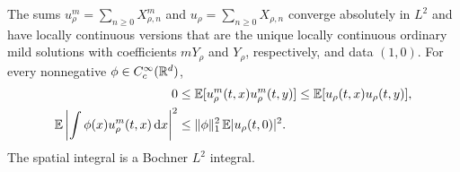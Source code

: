 \begin{proposition}
  \label{P:masked-source-moments}
  The sums $u_\rho^m = \sum_{n\ge0}X_{\rho,n}^m$ and $u_\rho =
  \sum_{n\ge0}X_{\rho,n}$ converge absolutely in $L^2$ and have locally
  continuous versions that are the unique locally continuous ordinary mild
  solutions with coefficients $mY_\rho$ and $Y_\rho$, respectively, and data
  $(1,0)$. For every nonnegative $\phi \in C_c^\infty(\mathbb{R}^d)$,
  \begin{align}
    0&\le\mathbb{E}[u_\rho^m(t,x)u_\rho^m(t,y)]
    \le\mathbb{E}[u_\rho(t,x)u_\rho(t,y)],\label{E:masked-two-point}\\
    \mathbb{E}\left|\int\phi(x)u_\rho^m(t,x)\,\mathrm{d} x\right|^2
    &\le \|\phi\|_1^2\,\mathbb{E}|u_\rho(t,0)|^2.
    \label{E:masked-average-source}
  \end{align}
  The spatial integral is a Bochner $L^2$ integral.
\end{proposition}

